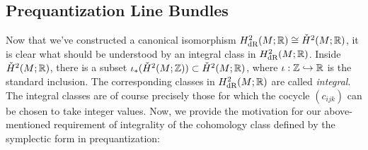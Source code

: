 \documentclass[parskip=half]{scrartcl}
\begin{document}
\subsection{Prequantization Line Bundles}

Now that we've constructed a canonical isomorphism $H^2_\text{dR}(M;\mathbb{R})\cong \check H^2(M;\mathbb{R})$, it is clear what should be understood by an integral class in $H^2_\text{dR}(M;\mathbb{R})$. Inside $\check H^2(M;\mathbb{R})$, there is a subset $\iota_*(\check H^2(M;\mathbb{Z}))\subset \check H^2(M;\mathbb{R})$, where $\iota:\mathbb{Z}\hookrightarrow \mathbb{R}$ is the standard inclusion. The corresponding classes in $H^2_\text{dR}(M;\mathbb{R})$ are called \emph{integral}. The integral classes are of course precisely those for which the cocycle $(c_{ijk})$ can be chosen to take integer values. Now, we provide the motivation for our above-mentioned requirement of integrality of the cohomology class defined by the symplectic form in prequantization:
\end{document}
